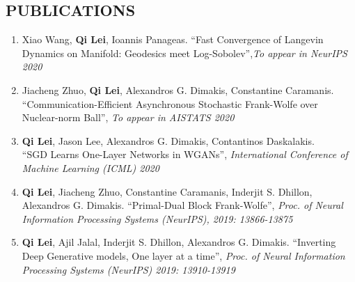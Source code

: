 \documentclass[margin, 10pt]{res} %
\begin{document}
\begin{resume}

\section{PUBLICATIONS}
\begin{enumerate}
\item{ Xiao Wang, \textbf{Qi Lei}, Ioannis Panageas. ``Fast Convergence of Langevin Dynamics on Manifold: Geodesics meet Log-Sobolev'',\textit{To appear in NeurIPS 2020}  }
  \item{Jiacheng Zhuo, \textbf{Qi Lei}, Alexandros G. Dimakis, Constantine 
      Caramanis.\\ ``Communication-Efficient Asynchronous Stochastic 
    Frank-Wolfe over Nuclear-norm Ball'', \textit{To appear in AISTATS 2020} }
\item{\textbf{Qi Lei}, Jason Lee, Alexandros G. Dimakis, Contantinos 
  Daskalakis. \\ ``SGD Learns One-Layer Networks in WGANs'', 
    \textit{International Conference of Machine Learning (ICML) 2020}}
  \item{ \textbf{Qi Lei}, Jiacheng Zhuo, Constantine Caramanis, Inderjit S. 
    Dhillon, Alexandros G. Dimakis. ``Primal-Dual Block Frank-Wolfe'', 
  \textit{Proc. of Neural Information Processing Systems (NeurIPS), 2019: 13866-13875} }
  \item{ \textbf{Qi Lei}, Ajil Jalal, Inderjit S. Dhillon, Alexandros G. 
      Dimakis. ``Inverting Deep Generative models, One layer at a time'', 
    \textit{Proc. of Neural Information Processing Systems (NeurIPS) 2019: 13910-13919} }


\end{enumerate}
\end{resume}
\end{document}
